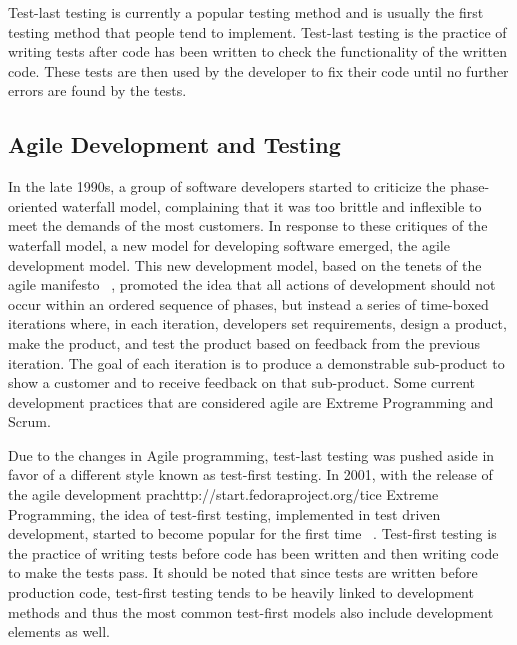 \documentclass{sig-alternate}
\begin{document}
Test-last testing is currently a popular testing method and is usually the first testing method that people tend to implement.  Test-last testing is the practice of writing tests after code has been written to check the functionality of the written code.  These tests are then used by the developer to fix their code until no further errors are found by the tests.

\subsection{Agile Development and Testing}

In the late 1990s, a group of software developers started to criticize the phase-oriented waterfall model, complaining that it was too brittle and inflexible to meet the demands of the most customers.  In response to these critiques of the waterfall model, a new model for developing software emerged, the agile development model.  This new development model, based on the tenets of the agile manifesto ~\cite{agile:xxx}, promoted the idea that all actions of development should not occur within an ordered sequence of phases, but instead a series of time-boxed iterations where, in each iteration, developers set requirements, design a product, make the product, and test the product based on feedback from the previous iteration.  The goal of each iteration is to produce a demonstrable sub-product to show a customer and to receive feedback on that sub-product.  Some current development practices that are considered agile are Extreme Programming and Scrum.

Due to the changes in Agile programming, test-last testing was pushed aside in favor of a different style known as test-first testing.  In 2001, with the release of the agile development prachttp://start.fedoraproject.org/tice Extreme Programming, the idea of test-first testing, implemented in test driven development, started to become popular for the first time ~\cite{Hammond:2012}. Test-first testing is the practice of writing tests before code has been written and then writing code to make the tests pass.  It should be noted that since tests are written before production code, test-first testing tends to be heavily linked to development methods and thus the most common test-first models also include development elements as well. 
\end{document}
